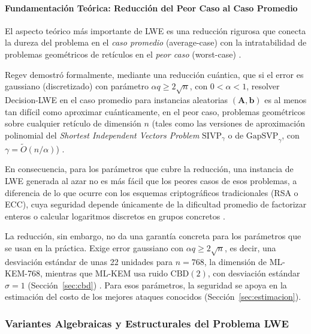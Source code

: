 \paragraph{Fundamentación Teórica: Reducción del Peor Caso al Caso Promedio}

El aspecto teórico más importante de LWE es una reducción rigurosa que conecta la dureza del problema en el \textit{caso promedio} (average-case) con la intratabilidad de problemas geométricos de retículos en el \textit{peor caso} (worst-case) \cite{regev2009lwe, rewal2023quantumsafe}.

Regev \cite{regev2009lwe} demostró formalmente, mediante una reducción cuántica, que si el error es gaussiano (discretizado) con parámetro $\alpha q \ge 2\sqrt{n}$, con $0 < \alpha < 1$, resolver Decision-LWE en el caso promedio para instancias aleatorias $(\mathbf{A}, \mathbf{b})$ es al menos tan difícil como aproximar cuánticamente, en el peor caso, problemas geométricos sobre cualquier retículo de dimensión $n$ (tales como las versiones de aproximación polinomial del \textit{Shortest Independent Vectors Problem} $\text{SIVP}_\gamma$ o de $\text{GapSVP}_\gamma$, con $\gamma = \tilde{O}(n/\alpha)$) \cite{regev2009lwe, rewal2023quantumsafe}.

En consecuencia, para los parámetros que cubre la reducción, una instancia de LWE generada al azar no es más fácil que los peores casos de esos problemas, a diferencia de lo que ocurre con los esquemas criptográficos tradicionales (RSA o ECC), cuya seguridad depende únicamente de la dificultad promedio de factorizar enteros o calcular logaritmos discretos en grupos concretos \cite{rewal2023quantumsafe, mukil2026implementing}.

La reducción, sin embargo, no da una garantía concreta para los parámetros que se usan en la práctica. Exige error gaussiano con $\alpha q \ge 2\sqrt{n}$, es decir, una desviación estándar de unas 22 unidades para $n = 768$, la dimensión de ML-KEM-768, mientras que ML-KEM usa ruido $\mathrm{CBD}(2)$, con desviación estándar $\sigma = 1$ (Sección~\ref{sec:cbd}) \cite{nist2024fips203}. Para esos parámetros, la seguridad se apoya en la estimación del costo de los mejores ataques conocidos (Sección~\ref{sec:estimacion}).



\subsubsection{Variantes Algebraicas y Estructurales del Problema LWE}

